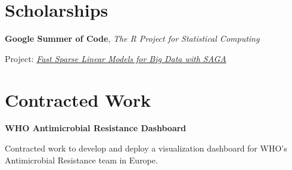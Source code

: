 \documentclass[
  10pt,
  headsepline=true,
  english,
  DIV=12
]{scrartcl}
\renewcommand*{%
  \mkbibnamegiven
}[1]{\ifitemannotation{highlight}{\textbf{#1}}{#1}}
\renewcommand*{%
  \mkbibnamefamily
}[1]{\ifitemannotation{highlight}{\textbf{#1}}{#1}}
\begin{document}
\section{Scholarships}
\begin{description}[
    labelwidth = \widthof{2018} + 1em,
    leftmargin = \widthof{2018} + 1em,
  ]

  \item[2018]{
    \textbf{Google Summer of Code}, \emph{The R Project for Statistical Computing}

    Project: \emph{\href{https://summerofcode.withgoogle.com/archive/2018/projects/6276491595743232/}{Fast Sparse Linear Models for Big Data with SAGA}}
  }
\end{description}

\section{Contracted Work}

\begin{description}[
    labelwidth = \widthof{2021} + 1em,
    leftmargin = \widthof{2021} + 1em,
  ]

  \item[2021]{
    \textbf{WHO Antimicrobial Resistance Dashboard}

    Contracted work to develop and deploy a visualization dashboard for
    WHO's Antimicrobial Resistance team in Europe.
  }
\end{description}
\end{document}
